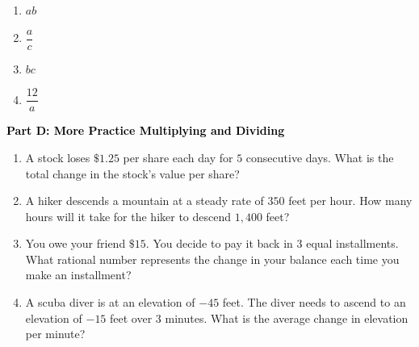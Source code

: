 \documentclass[12pt, letterpaper, fleqn]{article}
\begin{document}
\begin{enumerate}[itemsep=4.2cm, leftmargin=0.6cm, resume]
\item $ab$
\item $\dfrac{a}{c}$
\item $bc$
\item $\dfrac{12}{a}$
\end{enumerate}

\newpage

\begin{tcolorbox}[colback=customteal!20]
\large\textcolor{black}{\textbf{Part D: More Practice Multiplying and Dividing}}
\end{tcolorbox}

\vspace{3mm}

\begin{enumerate}[itemsep=4.2cm, leftmargin=0.6cm, resume]
\item A stock loses $\$1.25$ per share each day for $5$ consecutive days. What is the total change in the stock's value per share?
\item A hiker descends a mountain at a steady rate of $350$ feet per hour. How many hours will it take for the hiker to descend $1,400$ feet?
\item You owe your friend $\$15$. You decide to pay it back in $3$ equal installments. What rational number represents the change in your balance each time you make an installment?
\item A scuba diver is at an elevation of $-45$ feet. The diver needs to ascend to an elevation of $-15$ feet over $3$ minutes. What is the average change in elevation per minute?
\end{enumerate}
\end{document}
